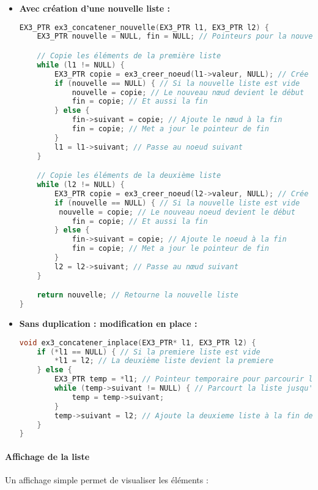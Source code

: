 \documentclass[a4paper,12pt]{article}
\begin{document}
\begin{itemize}
  \item \textbf{Avec création d'une nouvelle liste :}
\begin{lstlisting}[language=C, caption={Concaténation en créant une nouvelle liste}]
EX3_PTR ex3_concatener_nouvelle(EX3_PTR l1, EX3_PTR l2) {
    EX3_PTR nouvelle = NULL, fin = NULL; // Pointeurs pour la nouvelle liste

    // Copie les éléments de la première liste
    while (l1 != NULL) {
        EX3_PTR copie = ex3_creer_noeud(l1->valeur, NULL); // Crée un nouveau nœud
        if (nouvelle == NULL) { // Si la nouvelle liste est vide
            nouvelle = copie; // Le nouveau nœud devient le début
            fin = copie; // Et aussi la fin
        } else {
            fin->suivant = copie; // Ajoute le nœud à la fin
            fin = copie; // Met a jour le pointeur de fin
        }
        l1 = l1->suivant; // Passe au noeud suivant
    }

    // Copie les éléments de la deuxième liste
    while (l2 != NULL) {
        EX3_PTR copie = ex3_creer_noeud(l2->valeur, NULL); // Crée un nouveau nœud
        if (nouvelle == NULL) { // Si la nouvelle liste est vide
         nouvelle = copie; // Le nouveau noeud devient le début
            fin = copie; // Et aussi la fin
        } else {
            fin->suivant = copie; // Ajoute le noeud à la fin
            fin = copie; // Met a jour le pointeur de fin
        }
        l2 = l2->suivant; // Passe au nœud suivant
    }

    return nouvelle; // Retourne la nouvelle liste
}
\end{lstlisting}

  \item \textbf{Sans duplication : modification en place :}
\begin{lstlisting}[language=C, caption={Concaténation sans nouvelle liste}]
void ex3_concatener_inplace(EX3_PTR* l1, EX3_PTR l2) {
    if (*l1 == NULL) { // Si la premiere liste est vide
        *l1 = l2; // La deuxième liste devient la premiere
    } else {
        EX3_PTR temp = *l1; // Pointeur temporaire pour parcourir la liste
        while (temp->suivant != NULL) { // Parcourt la liste jusqu'au dernier noeud
            temp = temp->suivant;
        }
        temp->suivant = l2; // Ajoute la deuxieme liste à la fin de la premiere
    }
}
\end{lstlisting}
\end{itemize}

\paragraph{Affichage de la liste}  
Un affichage simple permet de visualiser les éléments :
\end{document}
